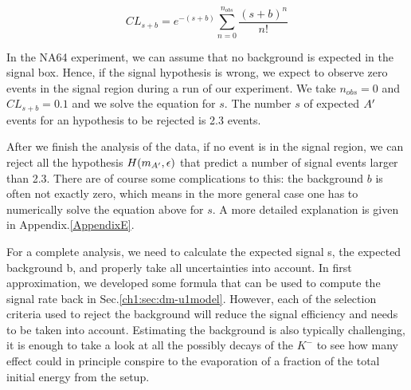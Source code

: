 \begin{equation}
  \label{eq:confidence-level-poisson}
  CL_{s+b} = e^{-(s+b)}\sum^{n_{obs}}_{n=0} \frac{(s+b)^n}{n!}
\end{equation}

In the NA64 experiment, we can assume that no background is expected in the signal box. Hence, if the signal hypothesis is wrong, we expect to observe zero events in the signal region during a run of our experiment. We take $n_{obs} = 0$ and $CL_{s+b} = 0.1$ and we solve the equation for $s$. The number $s$ of expected $A'$ events for an hypothesis to be rejected is 2.3 events.

After we finish the analysis of the data, if no event is in the signal region, we can reject all the hypothesis $H(m_{A'}, \epsilon)$ that predict a number of signal events larger than 2.3. There are of course some complications to this: the background $b$ is often not exactly zero, which means in the more general case one has to numerically solve the equation above for $s$. A more detailed explanation is given in Appendix.\ref{AppendixE}.

For a complete analysis, we need to calculate the expected signal s, the expected background b, and properly take all uncertainties into account. In first approximation, we developed some formula that can be used to compute the signal rate back in Sec.\ref{ch1:sec:dm-u1model}. However, each of the selection criteria used to reject the background will reduce the signal efficiency and needs to be taken into account. Estimating the background is also typically challenging, it is enough to take a look at all the possibly decays of the $K^-$\cite{particle-strange-mesons} to see how many effect could in principle conspire to the evaporation of a fraction of the total initial energy from the setup.

